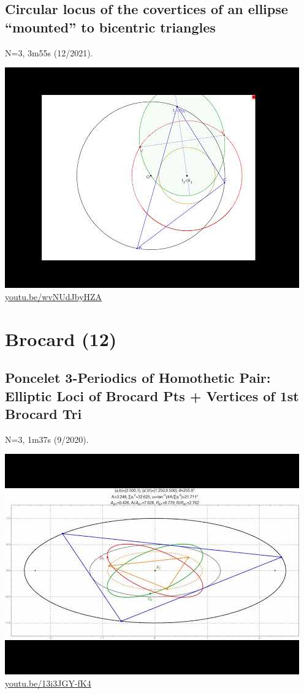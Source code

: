 \documentclass[12pt]{amsart}
\begin{document}
\subsection{Circular locus of the covertices of an ellipse ``mounted'' to bicentric triangles}
\label{vid:wvNUdJbyHZA}
\noindent N=3, 3m55s (12/2021). 
\begin{center}\includegraphics[width=.5\textwidth]{pics/wvNUdJbyHZA.jpg} \\ 
\href{https://youtu.be/wvNUdJbyHZA}{\url{youtu.be/wvNUdJbyHZA}}\end{center}
% 


\section{Brocard (12)}

\subsection{Poncelet 3-Periodics of Homothetic Pair: Elliptic Loci of Brocard Pts + Vertices of 1st Brocard Tri}
\label{vid:13i3JGY-fK4}
\noindent N=3, 1m37s (9/2020). 
\begin{center}\includegraphics[width=.5\textwidth]{pics/13i3JGY-fK4.jpg} \\ 
\href{https://youtu.be/13i3JGY-fK4}{\url{youtu.be/13i3JGY-fK4}}\end{center}
% 
\end{document}

